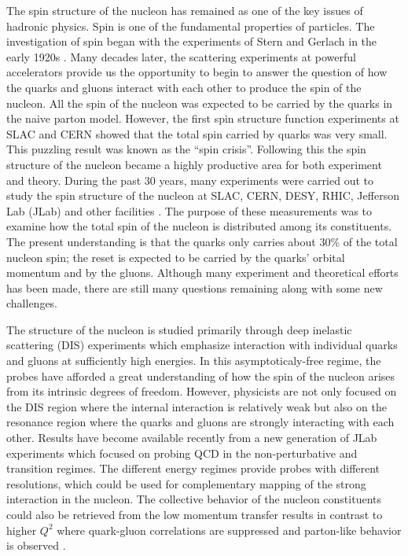 The spin structure of the nucleon has remained as one of the key issues of hadronic physics. Spin is one of the fundamental properties of particles. The investigation of spin began with the experiments of Stern and Gerlach in the early 1920s \cite{Gerlach1922}. Many decades later, the scattering experiments at powerful accelerators provide us the opportunity to begin to answer the question of how the quarks and gluons interact with each other to produce the spin of the nucleon. All the spin of the nucleon was expected to be carried by the quarks in the naive parton model. However, the first spin structure function experiments at SLAC \cite{Alguard1978} and CERN \cite{Ashman1988} showed that the total spin carried by quarks was very small. This puzzling result was known as the ``spin crisis''. Following this the spin structure of the nucleon became a highly productive area for both experiment and theory. During the past 30 years, many experiments were carried out to study the spin structure of the nucleon at SLAC, CERN, DESY, RHIC, Jefferson Lab (JLab) and other facilities \cite{Kuhn2009}. The purpose of these measurements was to examine how the total spin of the nucleon is distributed among its constituents. The present understanding is that the quarks only carries about 30\% of the total nucleon spin; the reset is expected to be carried by the quarks' orbital momentum and by the gluons. Although many experiment and theoretical efforts has been made, there are still many questions remaining along with some new challenges.

The structure of the nucleon is studied primarily through deep inelastic scattering (DIS) experiments which emphasize interaction with individual quarks and gluons at sufficiently high energies. In this asymptoticaly-free regime, the probes have afforded a great understanding of how the spin of the nucleon arises from its intrinsic degrees of freedom. However, physicists are not only focused on the DIS region where the internal interaction is relatively weak but also on the resonance region where the quarks and gluons are strongly interacting with each other. Results have become available recently from a new generation of JLab experiments which focused on probing QCD in the non-perturbative and transition regimes. The different energy regimes provide probes with different resolutions, which could be used for complementary mapping of the strong interaction in the nucleon. The collective behavior of the nucleon constituents could also be retrieved from the low momentum transfer results in contrast to higher $Q^2$ where quark-gluon correlations are suppressed and parton-like behavior is observed \cite{G2P}.

